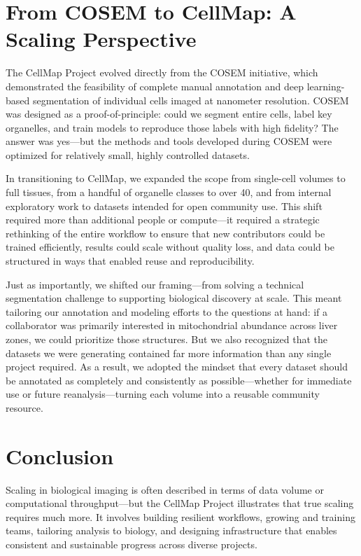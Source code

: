 \documentclass[times, twoside]{zHenriquesLab-StyleBioRxiv}
\begin{document}
\section*{From COSEM to CellMap: A Scaling Perspective}
The CellMap Project evolved directly from the COSEM initiative, which demonstrated the feasibility of complete manual annotation and deep learning-based segmentation of individual cells imaged at nanometer resolution. COSEM was designed as a proof-of-principle: could we segment entire cells, label key organelles, and train models to reproduce those labels with high fidelity? The answer was yes—but the methods and tools developed during COSEM were optimized for relatively small, highly controlled datasets.

In transitioning to CellMap, we expanded the scope from single-cell volumes to full tissues, from a handful of organelle classes to over 40, and from internal exploratory work to datasets intended for open community use. This shift required more than additional people or compute—it required a strategic rethinking of the entire workflow to ensure that new contributors could be trained efficiently, results could scale without quality loss, and data could be structured in ways that enabled reuse and reproducibility.

Just as importantly, we shifted our framing—from solving a technical segmentation challenge to supporting biological discovery at scale. This meant tailoring our annotation and modeling efforts to the questions at hand: if a collaborator was primarily interested in mitochondrial abundance across liver zones, we could prioritize those structures. But we also recognized that the datasets we were generating contained far more information than any single project required. As a result, we adopted the mindset that every dataset should be annotated as completely and consistently as possible—whether for immediate use or future reanalysis—turning each volume into a reusable community resource.

\section*{Conclusion}
Scaling in biological imaging is often described in terms of data volume or computational throughput—but the CellMap Project illustrates that true scaling requires much more. It involves building resilient workflows, growing and training teams, tailoring analysis to biology, and designing infrastructure that enables consistent and sustainable progress across diverse projects.
\end{document}

